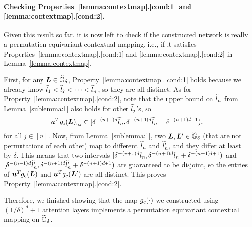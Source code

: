 \paragraph{Checking Properties~\ref{lemma:contextmap}.\ref{cond:1} and  \ref{lemma:contextmap}.\ref{cond:2}.}
Given this result so far, it is now left to check if the constructed network is really a permutation equivariant contextual mapping, i.e., if it satisfies Properties~\ref{lemma:contextmap}.\ref{cond:1} and \ref{lemma:contextmap}.\ref{cond:2} in Lemma~\ref{lemma:contextmap}.

First, for any ${\bm{L}} \in \widetilde{{\mathbb{G}}}_{\delta}$, Property~\ref{lemma:contextmap}.\ref{cond:1} holds because we already know $\widetilde{l}_1 < \widetilde{l}_2 < \dots < \widetilde{l}_n$, so they are all distinct.
As for Property~\ref{lemma:contextmap}.\ref{cond:2}, note that the upper bound on $\widetilde{l}_n$ from Lemma~\ref{sublemma:1} also holds for other $\widetilde{l}_j$'s, so
\begin{equation*}
{\bm{u}}^T g_{\rm c}({\bm{L}})_{:,j} \in [\delta^{-(n+1)d} \widetilde{l}_n, \delta^{-(n+1)d} \widetilde{l}_n + \delta^{-(n+1)d+1}),
\end{equation*}
for all $j \in [n]$. Now, from Lemma~\ref{sublemma:1}, two ${\bm{L}}, {\bm{L}}' \in \widetilde{{\mathbb{G}}}_{\delta}$ (that are not permutations of each other) map to different $\widetilde{l}_n$ and $\widetilde{l}'_n$, and they differ at least by $\delta$. This means that two intervals $[\delta^{-(n+1)d} \widetilde{l}_n, \delta^{-(n+1)d} \widetilde{l}_n + \delta^{-(n+1)d+1})$ and $[\delta^{-(n+1)d} \widetilde{l}'_n, \delta^{-(n+1)d} \widetilde{l}'_n + \delta^{-(n+1)d+1})$ are guaranteed to be disjoint, so the entries of ${\bm{u}}^T g_{\rm c}({\bm{L}})$ and ${\bm{u}}^T g_{\rm c}({\bm{L}}')$ are all distinct. This proves Property~\ref{lemma:contextmap}.\ref{cond:2}.

Therefore, we finished showing that the map $g_{\rm c}(\cdot)$ we constructed using $(1/\delta)^d+1$ attention layers implements a permutation equivariant contextual mapping on $\widetilde{{\mathbb{G}}}_{\delta}$.

